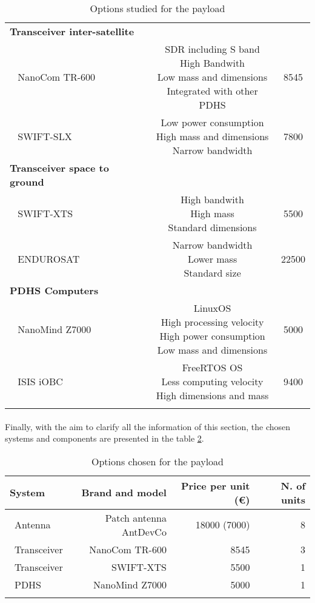\begin{longtable}{| l | c | c | }
\rowcolor[gray]{0.85} \textbf{Transceiver inter-satellite} &  &  \\
	   ~	NanoCom TR-600 & \makecell{SDR including S band\\ High Bandwith \\ Low mass and dimensions\\Integrated with other PDHS} & 8545 \\
	   \hline
	   ~	SWIFT-SLX & \makecell{Low power consumption\\ High mass and dimensions\\ Narrow bandwidth} & 7800 \\
	   \hline
	\hline
\rowcolor[gray]{0.85} \textbf{Transceiver space to ground} &  &  \\
~	SWIFT-XTS & \makecell{High bandwith\\ High mass \\ Standard dimensions} & 5500 \\
	   \hline
~	ENDUROSAT & \makecell{Narrow bandwidth\\ Lower mass\\ Standard size} & 22500 \\
\hline
\hline
\rowcolor[gray]{0.85} \textbf{PDHS Computers} &  &  \\
~	NanoMind Z7000 & \makecell{LinuxOS\\ High processing velocity\\ High power consumption\\ Low mass and dimensions} & 5000 \\
\hline
~	ISIS iOBC& \makecell{FreeRTOS OS\\ Less computing velocity \\ High dimensions and mass} & 9400 \\
\hline
\hline
	
\caption{Options studied for the payload}
\label{payloadoptions}
\end{longtable}

\paragraph{}Finally, with the aim to clarify all the information of this section, the chosen systems and components are presented in the table \ref{payloadchosen}.

\begin{longtable}{| l | r | r | r |}
	\hline
	\rowcolor[gray]{0.80}	\textbf{System} &  \textbf{Brand and model}     & \textbf{Price per unit (\euro)} & \textbf{N. of units}  \\
	\hline
	\endfirsthead
	
	~Antenna & Patch antenna AntDevCo & 18000 (7000) & 8 \\
	~Transceiver & NanoCom TR-600 & 8545 & 3 \\
	~Transceiver& SWIFT-XTS & 5500 &1\\
	~PDHS & NanoMind Z7000 & 5000 & 1 \\
	\hline
	
\caption{Options chosen for the payload}
\label{payloadchosen}
\end{longtable}